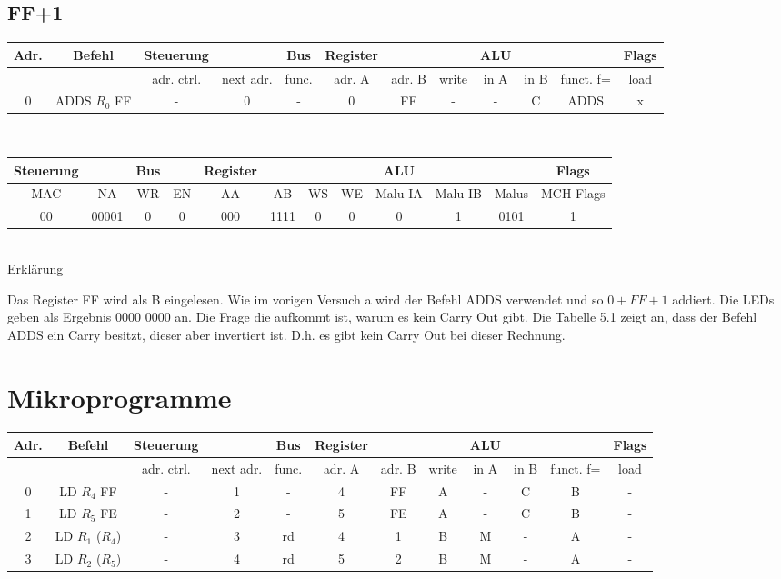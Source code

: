 \documentclass[paper=a4, fontsize=11pt]{scrartcl}
\numberwithin{equation}{section}
\numberwithin{figure}{section}
\numberwithin{table}{section}
\begin{document}

\subsection{FF+1}

\begin{tabular}{|c|c|cc|c|ccc|ccc|c|}
\hline
Adr. & Befehl &Steuerung & & Bus & Register & & & ALU & & & Flags \\
\hline
& & adr. ctrl. & next adr. & func. & adr. A & adr. B & write & in A & in B & funct. f= & load \\
\hline
0 & ADDS $R_{0}$ FF & - & 0 & - & 0 & FF & - & - & C & ADDS & x  \\
\hline
\end{tabular} \\

\begin{tabular}{|cc|cc|cccc|ccc|c|}
\hline
Steuerung & & Bus & & Register & & & & ALU & & & Flags \\
\hline
MAC & NA & WR & EN & AA & AB & WS & WE & Malu IA & Malu IB & Malus & MCH Flags \\
\hline
00 & 00001 & 0 & 0 & 000 & 1111 & 0 & 0 & 0 & 1 & 0101 & 1\\
\hline
\end{tabular} \\

\underline{Erklärung}

Das Register FF wird als B eingelesen. Wie im vorigen Versuch a wird der Befehl ADDS verwendet und so $0 + FF+ 1$ addiert. Die LEDs geben als Ergebnis 0000 0000 an. Die Frage die aufkommt ist, warum es kein Carry Out gibt. Die Tabelle 5.1 zeigt an, dass der Befehl ADDS ein Carry besitzt, dieser aber invertiert ist. D.h. es gibt kein Carry Out bei dieser Rechnung.


\newpage

\section{Mikroprogramme}

\begin{tabular}{|c|c|cc|c|ccc|ccc|c|}
\hline
Adr. & Befehl &Steuerung & & Bus & Register & & & ALU & & & Flags \\
\hline
& & adr. ctrl. & next adr. & func. & adr. A & adr. B & write & in A & in B & funct. f= & load \\
\hline
0 & LD $R_{4}$ FF & - & 1 & - & 4 & FF & A & - & C & B & - \\
\hline
1 & LD $R_{5}$ FE & - & 2 & - & 5 & FE & A & - & C & B & - \\
\hline
2 & LD $R_{1}$ ($R_{4}$) & - & 3 & rd & 4 & 1 & B & M & - & A & - \\
\hline
3 & LD $R_{2}$ ($R_{5}$) & - & 4 & rd & 5 & 2 & B & M & - & A & - \\
\hline
\end{tabular} \\
\end{document}
